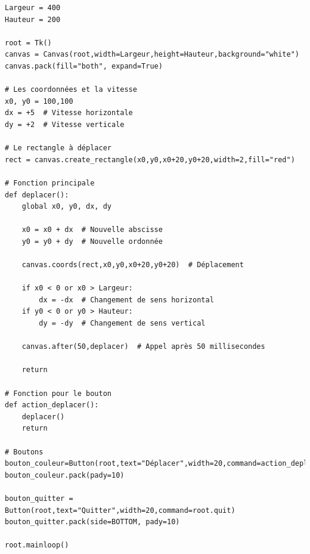 \documentclass[11pt,class=report,crop=false]{standalone}
\begin{document}
\begin{cours}
\begin{lstlisting}
Largeur = 400
Hauteur = 200

root = Tk()     
canvas = Canvas(root,width=Largeur,height=Hauteur,background="white")
canvas.pack(fill="both", expand=True)

# Les coordonnées et la vitesse
x0, y0 = 100,100
dx = +5  # Vitesse horizontale
dy = +2  # Vitesse verticale

# Le rectangle à déplacer
rect = canvas.create_rectangle(x0,y0,x0+20,y0+20,width=2,fill="red")

# Fonction principale
def deplacer():
    global x0, y0, dx, dy

    x0 = x0 + dx  # Nouvelle abscisse
    y0 = y0 + dy  # Nouvelle ordonnée

    canvas.coords(rect,x0,y0,x0+20,y0+20)  # Déplacement

    if x0 < 0 or x0 > Largeur:
        dx = -dx  # Changement de sens horizontal
    if y0 < 0 or y0 > Hauteur:
        dy = -dy  # Changement de sens vertical

    canvas.after(50,deplacer)  # Appel après 50 millisecondes
 
    return
    
# Fonction pour le bouton
def action_deplacer():
    deplacer()
    return

# Boutons
bouton_couleur=Button(root,text="Déplacer",width=20,command=action_deplacer)
bouton_couleur.pack(pady=10)

bouton_quitter = Button(root,text="Quitter",width=20,command=root.quit)
bouton_quitter.pack(side=BOTTOM, pady=10)

root.mainloop()
\end{lstlisting}

\end{cours}
\end{document}
